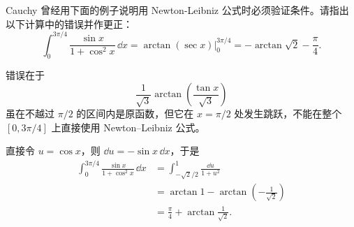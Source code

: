 \begin{xexercise}[1]
Cauchy 曾经用下面的例子说明用 Newton-Leibniz 公式时必须验证条件。请指出以下计算中的错误并作更正：
\[
  \int_0^{3\pi/4}\frac{\sin x}{1+\cos^2x}\,\dd x
  =\arctan(\sec x)\Big|_0^{3\pi/4}
  =-\arctan\sqrt2-\frac\pi4.
\]
\end{xexercise}
\begin{xsolution}
错误在于
\[
  \frac1{\sqrt3}\arctan\left(\frac{\tan x}{\sqrt3}\right)
\]
虽在不越过 $\pi/2$ 的区间内是原函数，但它在 $x=\pi/2$ 处发生跳跃，不能在整个 $[0,3\pi/4]$ 上直接使用 Newton--Leibniz 公式。

直接令 $u=\cos x$，则 $\dd u=-\sin x\,\dd x$，于是
\begin{align*}
  \int_0^{3\pi/4}\frac{\sin x}{1+\cos^2x}\,\dd x
  &=\int_{-\sqrt2/2}^{1}\frac{\dd u}{1+u^2}\\
  &=\arctan1-\arctan\left(-\frac1{\sqrt2}\right)\\
  &=\boxed{\frac\pi4+\arctan\frac1{\sqrt2}}.
\end{align*}
\end{xsolution}


